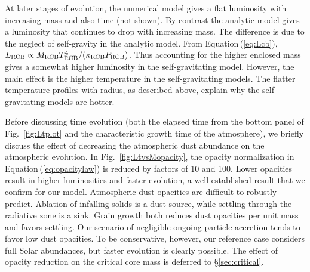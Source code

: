 \documentclass[apj, numberedappendix]{emulateapj}
\newcommand{\Eq}[1]{Equation\,(\ref{#1})}
\newcommand{\Fig}[1]{Fig.~\ref{#1}}
\newcommand{\cb}{_{\rm RCB}}
\begin{document}
At later stages of evolution, the numerical model gives a flat luminosity with increasing mass and also time (not shown).  By contrast the analytic model gives a luminosity that continues to drop with increasing mass.  The difference is due to the neglect of self-gravity in the analytic model.  From \Eq{eq:Lcb}, $L\cb \propto M\cb T\cb^4/ (\kappa\cb  P\cb)$.  Thus accounting for the higher enclosed mass gives a somewhat higher luminosity in the self-gravitating model.  However, the main effect is the higher temperature in the self-gravitating models.  The flatter temperature profiles with radius, as described above, explain why the self-gravitating models are hotter.



Before discussing time evolution (both the elapsed time from the bottom panel of \Fig{fig:Ltplot} and the characteristic growth time of the atmosphere), we briefly discuss the effect of decreasing the atmospheric dust abundance on the atmospheric evolution.  In \Fig{fig:LtvsMopacity}, the opacity normalization in \Eq{eq:opacitylaw} is reduced by factors of 10 and 100.  Lower opacities result in higher luminosities and faster evolution, a well-established result \citep{HubBod05} that we confirm for our model.  Atmospheric dust opacities are difficult to robustly predict. Ablation of infalling solids is a dust source, while settling through the radiative zone is a sink.  Grain growth both reduces dust opacities per unit mass and favors settling.  Our scenario of negligible ongoing particle accretion tends to favor low dust opacities.   To be conservative, however, our reference case considers full Solar abundances, but faster evolution is clearly possible. The effect of opacity reduction on the critical core mass is deferred to \S\ref{sec:critical}. 
\end{document}
